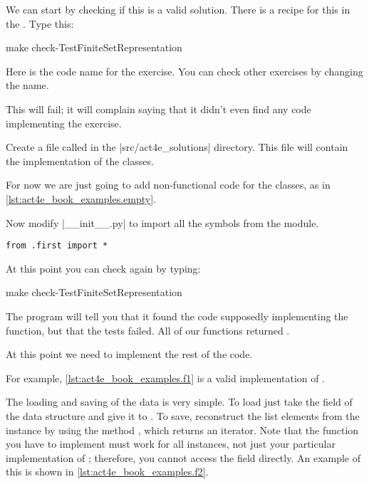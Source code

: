 We can start by checking if this is a valid solution.
There is a recipe for this in the .
Type this:

\begin{console}
    make check-TestFiniteSetRepresentation
\end{console}

Here  is the code name for the exercise.
You can check other exercises by changing the name.

This will fail; it will complain saying that it didn't even find any code implementing the exercise.


Create a file called  in the \files|src/act4e_solutions| directory.
This file will contain the implementation of the classes.

For now we are just going to add non-functional code for the classes,
as in \cref{lst:act4e_book_examples.empty}.

\begin{longcode}
    \caption{}
    
    \label{lst:act4e_book_examples.empty}
\end{longcode}

Now modify \files|__init__.py| to import all the symbols from the  module.

\begin{verbatim}
from .first import *
\end{verbatim}

At this point you can check again by typing:

\begin{console}
    make check-TestFiniteSetRepresentation
\end{console}

The program will tell you that it found the code supposedly implementing the function,
but that the tests failed.
All of our functions returned .

At this point we need to implement the rest of the code.

For example, \cref{lst:act4e_book_examples.f1} is a valid implementation of \FiniteSet.

\begin{longcode}
    \caption{}
    \label{lst:act4e_book_examples.f1}
\end{longcode}

The loading and saving of the data is very simple.
To load just take the  field of the data structure and give it to .
To save, reconstruct the list elements from the  instance by using the method , which returns an iterator.
Note that the  function you have to implement must work for all \FiniteSet instances, not just your particular implementation of \FiniteSet; therefore, you cannot access the  field directly.
An example of this is shown in \cref{lst:act4e_book_examples.f2}.

